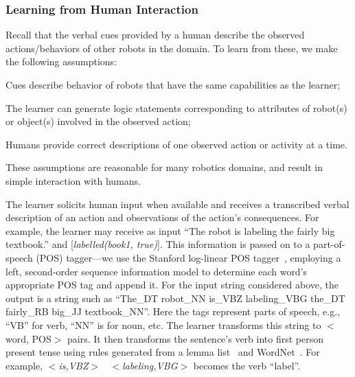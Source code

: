 \documentclass{article}
\newenvironment{s_itemize}{\begin{list}{$\bullet$}
{\setlength{\rightmargin}{0em}
\setlength{\itemsep}{0em}
\setlength{\topsep}{0em}
\setlength{\parsep}{0em}}}{\end{list}}
\begin{document}
\subsubsection{Learning from Human Interaction}
Recall that the verbal cues provided by a human describe the observed
actions/behaviors of other robots in the domain. To learn from these,
we make the following assumptions:
\begin{s_itemize}
\item Cues describe behavior of robots that have the same capabilities
  as the learner;
\item The learner can generate logic statements corresponding to
  attributes of robot(s) or object(s) involved in the observed action;
\item Humans provide correct descriptions of one observed action or
  activity at a time.
\end{s_itemize}
These assumptions are reasonable for many robotics domains, and result
in simple interaction with humans.

The learner solicits human input when available and receives a
transcribed verbal description of an action and observations of the
action's consequences. For example, the learner may receive as input
``The robot is labeling the fairly big textbook.'' and
[\textit{labelled(book1, true)}]. This information is passed on to a
part-of-speech (POS) tagger---we use the Stanford log-linear POS
tagger~\cite{toutanova:hlt-naacl03}, employing a left, second-order
sequence information model to determine each word's appropriate POS
tag and append it. For the input string considered above, the output
is a string such as ``The\_DT robot\_NN is\_VBZ labeling\_VBG the\_DT
fairly\_RB big\_JJ textbook\_NN''. Here the tags represent parts of
speech, e.g., ``VB'' for verb, ``NN'' is for noun, etc. The learner
transforms this string to
$<$word, POS$>$ pairs. It then transforms the sentence's verb into
first person present tense using rules generated from a lemma
list~\cite{lemma-txt} and WordNet~\cite{miller:wordnet95}.  For
example, \textit{$<$is,VBZ$>$~ $<$labeling,VBG$>$} becomes the verb
``label''.
\end{document}
